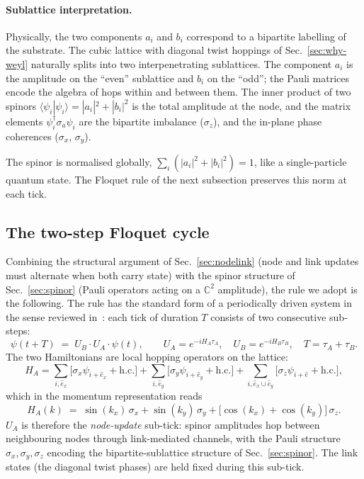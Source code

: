 \documentclass[11pt,a4paper]{article}
\begin{document}
\paragraph{Sublattice interpretation.}
Physically, the two components $a_i$ and $b_i$ correspond to a
bipartite labelling of the substrate. The cubic lattice with
diagonal twist hoppings of Sec.~\ref{sec:why-weyl} naturally
splits into two interpenetrating sublattices. The component
$a_i$ is the amplitude on the ``even'' sublattice and $b_i$ on
the ``odd''; the Pauli matrices encode the algebra of hops
within and between them. The inner product of two spinors
$\langle \psi_i | \psi_i \rangle = |a_i|^2 + |b_i|^2$ is the
total amplitude at the node, and the matrix elements
$\psi_i^\dagger \sigma_a \psi_i$ are the bipartite imbalance
($\sigma_z$), and the in-plane phase coherences ($\sigma_x$,
$\sigma_y$).

The spinor is normalised globally,
$\sum_i (|a_i|^2 + |b_i|^2) = 1$, like a single-particle
quantum state. The Floquet rule of the next subsection
preserves this norm at each tick.

\subsection{The two-step Floquet cycle}

Combining the structural argument of Sec.~\ref{sec:nodelink}
(node and link updates must alternate when both carry state)
with the spinor structure of Sec.~\ref{sec:spinor} (Pauli
operators acting on a $\mathbb{C}^2$ amplitude), the rule we
adopt is the following. The rule has the standard form of a
periodically driven system in the sense reviewed
in~\cite{eckardt2017}: each tick of duration $T$ consists of
two consecutive sub-steps:
\begin{equation}
\psi(t + T) \;=\; U_B \cdot U_A \cdot \psi(t),
\qquad
U_A = e^{-i H_A \tau_A},
\quad
U_B = e^{-i H_B \tau_B},
\quad
T = \tau_A + \tau_B.
\label{eq:floquet_cycle}
\end{equation}
The two Hamiltonians are local hopping operators on the lattice:
\begin{equation}
H_A = \sum_{i,\hat e_x} \!\big[\sigma_x \psi_{i+\hat e_x} + \mathrm{h.c.}\big]
    + \sum_{i,\hat e_y} \!\big[\sigma_y \psi_{i+\hat e_y} + \mathrm{h.c.}\big]
    + \sum_{i,\hat e_x \cup \hat e_y} \big[\sigma_z \psi_{i+\hat e} + \mathrm{h.c.}\big],
\label{eq:HA_realspace}
\end{equation}
which in the momentum representation reads
\begin{equation}
H_A(k) \;=\; \sin(k_x)\,\sigma_x + \sin(k_y)\,\sigma_y
        + \big[\cos(k_x) + \cos(k_y)\big]\,\sigma_z.
\label{eq:HA_kspace}
\end{equation}
$U_A$ is therefore the \emph{node-update} sub-tick: spinor
amplitudes hop between neighbouring nodes through link-mediated
channels, with the Pauli structure $\sigma_x, \sigma_y, \sigma_z$
encoding the bipartite-sublattice structure
of Sec.~\ref{sec:spinor}. The link states (the diagonal twist
phases) are held fixed during this sub-tick.
\end{document}
